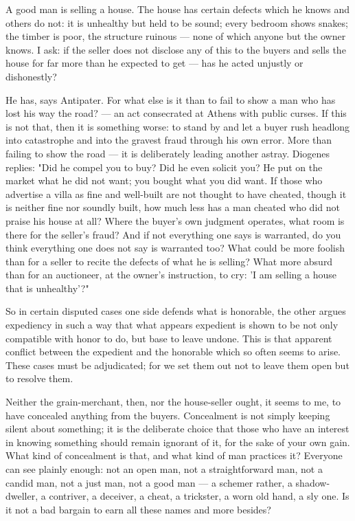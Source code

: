  A good man is selling a house. The house has certain defects which he knows and others do not: it is unhealthy but held to be sound; every bedroom shows snakes; the timber is poor, the structure ruinous — none of which anyone but the owner knows. I ask: if the seller does not disclose any of this to the buyers and sells the house for far more than he expected to get — has he acted unjustly or dishonestly?

 He has, says Antipater. For what else is it than to fail to show a man who has lost his way the road? — an act consecrated at Athens with public curses. If this is not that, then it is something worse: to stand by and let a buyer rush headlong into catastrophe and into the gravest fraud through his own error. More than failing to show the road — it is deliberately leading another astray. Diogenes replies: "Did he compel you to buy? Did he even solicit you? He put on the market what he did not want; you bought what you did want. If those who advertise a villa as fine and well-built are not thought to have cheated, though it is neither fine nor soundly built, how much less has a man cheated who did not praise his house at all? Where the buyer's own judgment operates, what room is there for the seller's fraud? And if not everything one says is warranted, do you think everything one does not say is warranted too? What could be more foolish than for a seller to recite the defects of what he is selling? What more absurd than for an auctioneer, at the owner's instruction, to cry: 'I am selling a house that is unhealthy'?"

 So in certain disputed cases one side defends what is honorable, the other argues expediency in such a way that what appears expedient is shown to be not only compatible with honor to do, but base to leave undone. This is that apparent conflict between the expedient and the honorable which so often seems to arise. These cases must be adjudicated; for we set them out not to leave them open but to resolve them.

 Neither the grain-merchant, then, nor the house-seller ought, it seems to me, to have concealed anything from the buyers. Concealment is not simply keeping silent about something; it is the deliberate choice that those who have an interest in knowing something should remain ignorant of it, for the sake of your own gain. What kind of concealment is that, and what kind of man practices it? Everyone can see plainly enough: not an open man, not a straightforward man, not a candid man, not a just man, not a good man — a schemer rather, a shadow-dweller, a contriver, a deceiver, a cheat, a trickster, a worn old hand, a sly one. Is it not a bad bargain to earn all these names and more besides?

